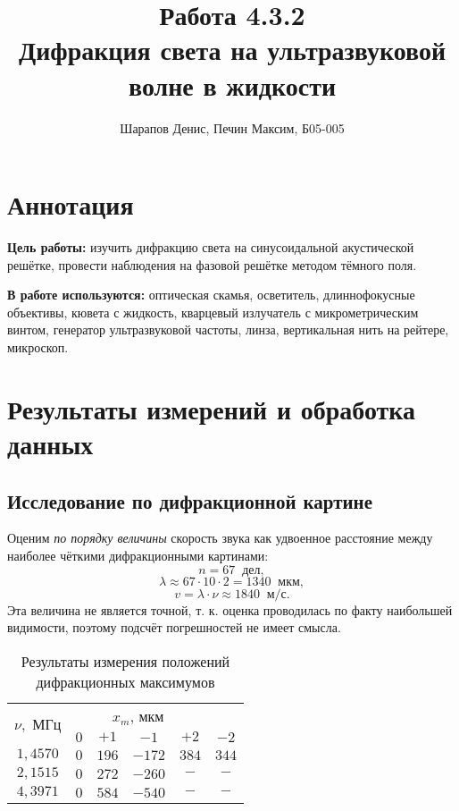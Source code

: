 \documentclass[a4paper]{article}
\title{Работа 4.3.2 \\ Дифракция света на ультразвуковой волне в жидкости}
\author{Шарапов Денис, Печин Максим, Б05-005}
\date{}
\begin{document}
    \maketitle
    \tableofcontents
    \newpage
    
\section{Аннотация}

\noindent\textbf{Цель работы:} изучить дифракцию света на синусоидальной акустической решётке, провести наблюдения на фазовой решётке методом тёмного поля. \smallskip
 
\noindent \textbf{В работе используются:} оптическая скамья, осветитель, длиннофокусные объективы, кювета с жидкость, кварцевый излучатель с микрометрическим винтом, генератор ультразвуковой частоты, линза, вертикальная нить на рейтере, микроскоп.

\section{Результаты измерений и обработка данных}

\subsection{Исследование по дифракционной картине}

Оценим \emph{по порядку величины} скорость звука как удвоенное расстояние между наиболее чёткими дифракционными картинами:
$$n = 67 \;\;\text{дел},$$
$$\lambda \approx 67\cdot10\cdot2=1340 \;\; \text{мкм},$$
$$v = \lambda \cdot \nu \approx 1840 \;\; \text{м/с}.$$
Эта величина не является точной, т. к. оценка проводилась по факту наибольшей видимости, поэтому подсчёт погрешностей не имеет смысла.


\begin{table}[!ht]
    \centering
    \caption{Результаты измерения положений дифракционных максимумов}
    \begin{tabular}{|c|cccc|c|}
    \hline
    \multirow{2}{*}{$\nu,$ МГц} & \multicolumn{4}{c|}{$x_m$, мкм}                                                               &       \\ \cline{2-6} 
                                & \multicolumn{1}{c|}{$0$} & \multicolumn{1}{c|}{$+1$}  & \multicolumn{1}{c|}{$-1$}   & $+2$  & $-2$  \\ \hline
    $1,4570$                    & \multicolumn{1}{c|}{$0$} & \multicolumn{1}{c|}{$196$} & \multicolumn{1}{c|}{$-172$} & $384$ & $344$ \\ \hline
    $2,1515$                    & \multicolumn{1}{c|}{$0$} & \multicolumn{1}{c|}{$272$} & \multicolumn{1}{c|}{$-260$} & $-$   & $-$   \\ \hline
    $4,3971$                    & \multicolumn{1}{c|}{$0$} & \multicolumn{1}{c|}{$584$} & \multicolumn{1}{c|}{$-540$} & $-$   & $-$   \\ \hline
    \end{tabular}
\end{table}
\end{document}
